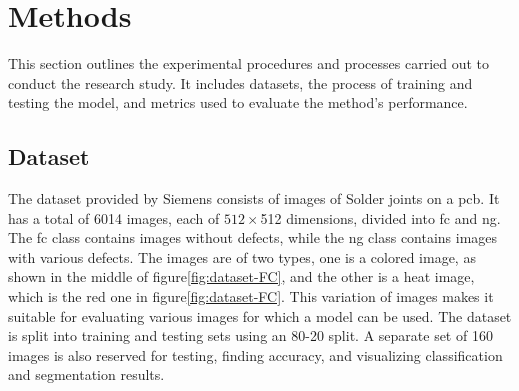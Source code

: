 \chapter{Methods}

This section outlines the experimental procedures and processes carried out to conduct the research study. It includes datasets, the process of training and testing the model, and metrics used to evaluate the method's performance.

\section{Dataset}
The dataset provided by Siemens consists of images of Solder joints on a \gls{pcb}. It has a total of 6014 images, each of $512 \times $512 dimensions, divided into \gls{fc} and \gls{ng}. The \gls{fc} class contains images without defects, while the \gls{ng} class contains images with various defects. The images are of two types, one is a colored image, as shown in the middle of figure\ref{fig:dataset-FC}, and the other is a heat image, which is the red one in figure\ref{fig:dataset-FC}. This variation of images makes it suitable for evaluating various images for which a model can be used. The dataset is split into training and testing sets using an 80-20 split. A separate set of 160 images is also reserved for testing, finding accuracy, and visualizing classification and segmentation results.

